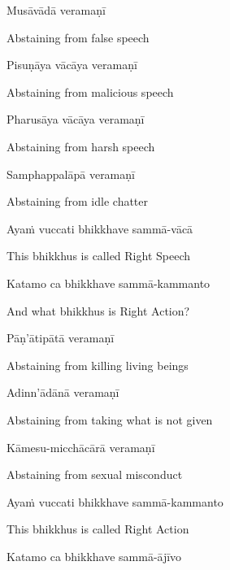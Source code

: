 Musāvādā veramaṇī

\begin{english}
  Abstaining from false speech
\end{english}

Pisuṇāya vācāya veramaṇī

\begin{english}
  Abstaining from malicious speech
\end{english}

Pharusāya vācāya veramaṇī

\begin{english}
  Abstaining from harsh speech
\end{english}

Samphappalāpā veramaṇī

\begin{english}
  Abstaining from idle chatter
\end{english}

Ayaṁ vuccati bhikkhave sammā-vācā

\begin{english}
  This bhikkhus is called Right Speech
\end{english}

Katamo ca bhikkhave sammā-kammanto

\begin{english}
  And what bhikkhus is Right Action?
\end{english}

Pāṇ'ātipātā veramaṇī

\begin{english}
  Abstaining from killing living beings
\end{english}

Adinn'ādānā veramaṇī

\begin{english}
  Abstaining from taking what is not given
\end{english}

Kāmesu-micchācārā veramaṇī

\begin{english}
  Abstaining from sexual misconduct
\end{english}

Ayaṁ vuccati bhikkhave sammā-kammanto

\begin{english}
  This bhikkhus is called Right Action
\end{english}

Katamo ca bhikkhave sammā-ājīvo

